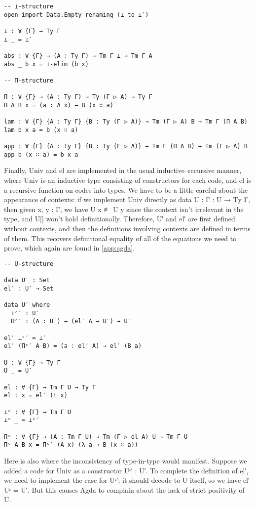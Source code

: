 \documentclass{article}
\renewcommand{\_}{\textrm{\textscale{.5}{\textunderscore}}}
\newcommand{\univ}{\mathrm{Univ}}
\newcommand{\El}{\mathrm{el}}
\theoremstyle{definition}
\theoremstyle{plain}
\begin{document}
\begin{verbatim}
-- ⊥-structure
open import Data.Empty renaming (⊥ to ⊥′)

⊥ : ∀ {Γ} → Ty Γ
⊥ _ = ⊥′

abs : ∀ {Γ} → (A : Ty Γ) → Tm Γ ⊥ → Tm Γ A
abs _ b x = ⊥-elim (b x)

-- Π-structure

Π : ∀ {Γ} → (A : Ty Γ) → Ty (Γ ▷ A) → Ty Γ
Π A B x = (a : A x) → B (x ∷ a)

lam : ∀ {Γ} {A : Ty Γ} {B : Ty (Γ ▷ A)} → Tm (Γ ▷ A) B → Tm Γ (Π A B)
lam b x a = b (x ∷ a)

app : ∀ {Γ} {A : Ty Γ} {B : Ty (Γ ▷ A)} → Tm Γ (Π A B) → Tm (Γ ▷ A) B
app b (x ∷ a) = b x a
\end{verbatim}

Finally, $\univ$ and $\El$ are implemented in the usual inductive--recursive manner,
where $\univ$ is an inductive type consisting of constructors for each code,
and $\El$ is a recursive function on codes into types.
We have to be a little careful about the appearance of contexts:
if we implement $\univ$ directly as {\codefont data U : {Γ : U} → Ty Γ},
then given {\codefont x, y : Γ}, we have {\codefont U x ≢ U y} since the context isn't irrelevant in the type,
and {\codefont U[]} won't hold definitionally.
Therefore, {\codefont U′} and {\codefont el′} are first defined without contexts,
and then the definitions involving contexts are defined in terms of them.
This recovers definitional equality of all of the equations we need to prove,
which again are found in \cref{app:agda}.

\begin{verbatim}
-- U-structure

data U′ : Set
el′ : U′ → Set

data U′ where
  ⊥ᶜ′ : U′
  Πᶜ′ : (A : U′) → (el′ A → U′) → U′

el′ ⊥ᶜ′ = ⊥′
el′ (Πᶜ′ A B) = (a : el′ A) → el′ (B a)

U : ∀ {Γ} → Ty Γ
U _ = U′

el : ∀ {Γ} → Tm Γ U → Ty Γ
el t x = el′ (t x)

⊥ᶜ : ∀ {Γ} → Tm Γ U
⊥ᶜ _ = ⊥ᶜ′

Πᶜ : ∀ {Γ} → (A : Tm Γ U) → Tm (Γ ▷ el A) U → Tm Γ U
Πᶜ A B x = Πᶜ′ (A x) (λ a → B (x ∷ a))
\end{verbatim}

Here is also where the inconsistency of type-in-type would manifest.
Suppose we added a code for $\univ$ as a constructor {\codefont Uᶜ′ : U′}.
To complete the definition of {\codefont el′}, we need to implement the case for {\codefont Uᶜ′};
it should decode to {\codefont U} itself, so we have {\codefont el′ Uᶜ = U′}.
But this causes Agda to complain about the lack of strict positivity of {\codefont U}.
\end{document}
